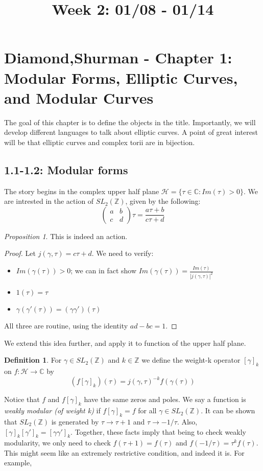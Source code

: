 \documentclass[11pt]{article}
\title{Week 2: 01/08 - 01/14}
\date{}
\theoremstyle{definition}
\newtheorem{definition}{Definition}[section]
\theoremstyle{example}
\theoremstyle{remark}
\theoremstyle{lemma}
\theoremstyle{proposition}
\newtheorem{proposition}{Proposition}[section]
\theoremstyle{Problem}
\theoremstyle{Solution}
\theoremstyle{theorem}
\theoremstyle{corollary}
\begin{document}
\maketitle



\section{Diamond,Shurman - Chapter 1: Modular Forms, Elliptic Curves, and Modular Curves}
The goal of this chapter is to define the objects in the title. Importantly, we will develop different languages to talk about elliptic curves. A point of great interest will be that elliptic curves and complex torii are in bijection.

\subsection{1.1-1.2: Modular forms}
The story begins in the complex upper half plane $\mathcal{H} = \{\tau\in \mathbb{C} : Im(\tau)>0 \}$. We are intrested in the action of $SL_2(\mathbb{Z})$, given by the following:
$$ \begin{pmatrix}
a & b \\
c & d
\end{pmatrix} \tau = \frac{a\tau+b}{c\tau+d}$$
\begin{proposition}
This is indeed an action.
\end{proposition}
\begin{proof}
Let $j(\gamma, \tau) = c\tau + d$. We need to verify:
\begin{itemize}
\item $Im(\gamma(\tau)) > 0$; we can in fact show $Im(\gamma(\tau)) = \frac{Im(\tau)}{|j(\gamma,\tau)|^2}$
\item $1(\tau) = \tau$
\item $\gamma(\gamma'(\tau)) = (\gamma\gamma')(\tau)$
\end{itemize}
All three are routine, using the identity $ad-bc = 1$.
\end{proof}
We extend this idea further, and apply it to function of the upper half plane.
\begin{definition}
For $\gamma \in SL_2(\mathbb{Z})$ and $k\in \mathbb{Z}$ we define the weight-k operator $[\gamma]_k$ on $f: \mathcal{H} \to \mathbb{C}$ by 
$$ (f[\gamma]_k) ( \tau) = j(\gamma, \tau)^{-k} f(\gamma(\tau))$$
\end{definition}
Notice that $f$ and $f[\gamma]_k$ have the same zeros and poles. We say a function is \textit{weakly modular (of weight k)} if $f[\gamma]_k = f$ for all $\gamma \in SL_2(\mathbb{Z})$. It can be shown that $SL_2(\mathbb{Z})$ is generated by $\tau \to \tau+1$ and $\tau \to -1/\tau$. Also, $[\gamma]_k[\gamma']_k = [\gamma\gamma']_k$. Together, these facts imply that being to check weakly modularity, we only need to check $f(\tau+1) = f(\tau)$ and $f(-1/\tau) = \tau^k f(\tau)$. This might seem like an extremely restrictive condition, and indeed it is. For example,
\end{document}
